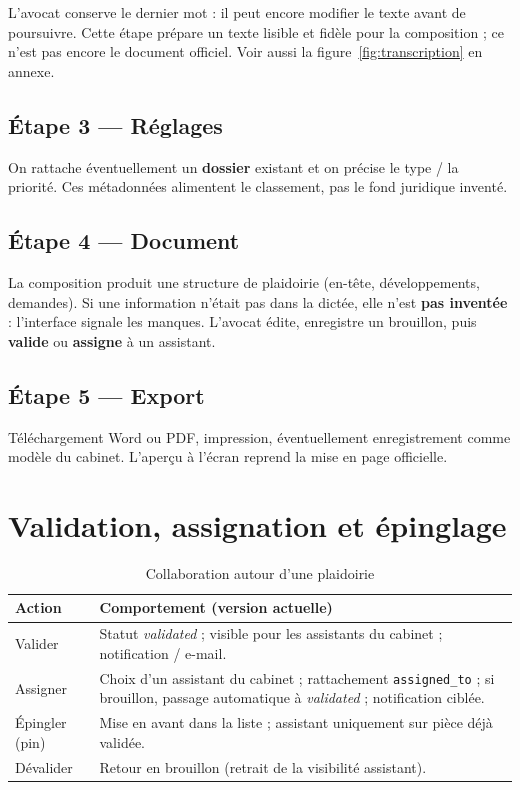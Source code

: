 L'avocat conserve le dernier mot : il peut encore modifier le texte avant de poursuivre. Cette étape prépare un texte lisible et fidèle pour la composition ; ce n'est pas encore le document officiel. Voir aussi la figure~\ref{fig:transcription} en annexe.

\subsection{Étape 3 --- Réglages}
On rattache éventuellement un \textbf{dossier} existant et on précise le type / la priorité. Ces métadonnées alimentent le classement, pas le fond juridique inventé.

\subsection{Étape 4 --- Document}
La composition produit une structure de plaidoirie (en-tête, développements, demandes). Si une information n'était pas dans la dictée, elle n'est \textbf{pas inventée} : l'interface signale les manques. L'avocat édite, enregistre un brouillon, puis \textbf{valide} ou \textbf{assigne} à un assistant.

\subsection{Étape 5 --- Export}
Téléchargement Word ou PDF, impression, éventuellement enregistrement comme modèle du cabinet. L'aperçu à l'écran reprend la mise en page officielle.

\section{Validation, assignation et épinglage}

\begin{table}[H]
\centering
\caption{Collaboration autour d'une plaidoirie}
\label{tab:collab}
\small
\begin{tabular}{@{}lp{9.8cm}@{}}
\toprule
\textbf{Action} & \textbf{Comportement (version actuelle)} \\
\midrule
Valider & Statut \textit{validated} ; visible pour les assistants du cabinet ; notification / e-mail. \\
Assigner & Choix d'un assistant du cabinet ; rattachement \texttt{assigned\_to} ; si brouillon, passage automatique à \textit{validated} ; notification ciblée. \\
Épingler (pin) & Mise en avant dans la liste ; assistant uniquement sur pièce déjà validée. \\
Dévalider & Retour en brouillon (retrait de la visibilité assistant). \\
\bottomrule
\end{tabular}
\end{table}

